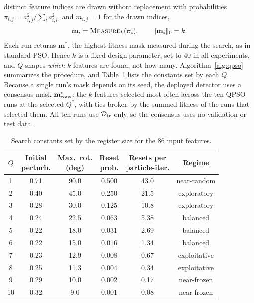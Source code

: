 \documentclass[conference]{IEEEtran}
\begin{document}
distinct feature indices are drawn without replacement with
probabilities $\pi_{i,j}=a_{i,j}^{2}/\sum_{l}a_{i,l}^{2}$, and
$m_{i,j}=1$ for the drawn indices,
\begin{equation}
\mathbf{m}_i = \textsc{Measure}_k(\boldsymbol{\pi}_i),
\qquad \|\mathbf{m}_i\|_0 = k .
\label{eq:qpso_measure}
\end{equation}
Each run returns $\mathbf{m}^{*}$, the
highest-fitness mask measured during the search, as in standard PSO.
Hence $k$ is a fixed design parameter, set to 40 in all experiments,
and $Q$ shapes \emph{which} $k$ features are found, not how many.
Algorithm~\ref{alg:qpso} summarizes the procedure, and
Table~\ref{tab:q_constants} lists the constants set by each $Q$.
Because a single run's mask depends on its
seed, the deployed detector uses a consensus mask
$\mathbf{m}^{*}_{\rm cons}$: the $k$ features selected most often
across the ten QPSO runs at the selected $Q^{*}$, with ties broken by
the summed fitness of the runs that selected them. All ten runs use
$\mathcal{D}_{\rm tr}$ only, so the consensus uses no validation or
test data.

\begin{table}[!t]
\centering
\scriptsize
\caption{Search constants set by the
register size for the 86 input features.}
\label{tab:q_constants}
\setlength{\tabcolsep}{4pt}
\renewcommand{\arraystretch}{1.05}
\begin{tabular}{cccccc}
\hline\toprule
$Q$ & \makecell{Initial\\perturb.} & \makecell{Max.\ rot.\\(deg)} & \makecell{Reset\\prob.} & \makecell{Resets per\\particle-iter.} & Regime \\
\hline\toprule
1  & 0.71 & 90.0 & 0.500  & 43.0 & near-random \\
2  & 0.40 & 45.0 & 0.250  & 21.5 & exploratory \\
3  & 0.28 & 30.0 & 0.125  & 10.8 & exploratory \\
4  & 0.24 & 22.5 & 0.063  & 5.38 & balanced \\
5  & 0.22 & 18.0 & 0.031  & 2.69 & balanced \\
6  & 0.22 & 15.0 & 0.016  & 1.34 & balanced \\
7  & 0.23 & 12.9 & 0.008  & 0.67 & exploitative \\
8  & 0.25 & 11.3 & 0.004  & 0.34 & exploitative \\
9  & 0.29 & 10.0 & 0.002  & 0.17 & near-frozen \\
10 & 0.32 & 9.0  & 0.001  & 0.08 & near-frozen \\
\hline\toprule
\end{tabular}
\end{table}
\end{document}
